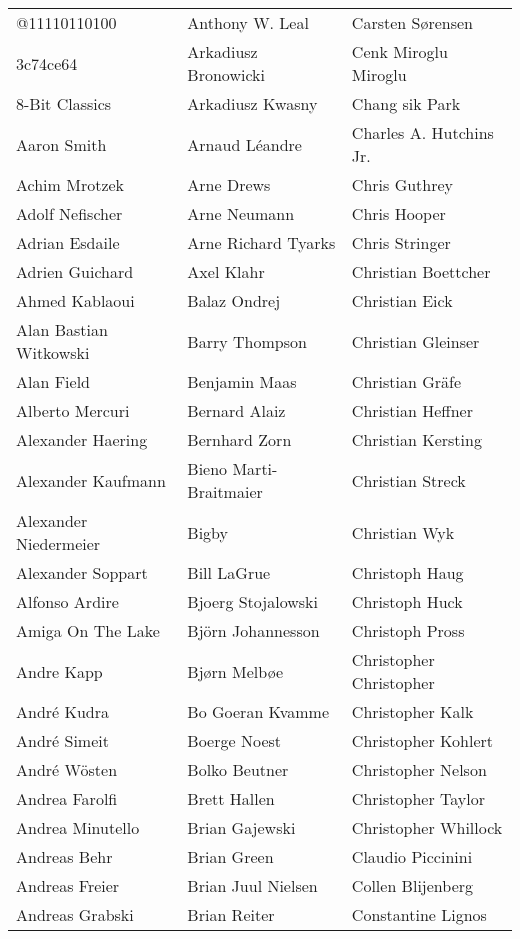 \newpage
\setlength{\tabcolsep}{1mm}
\begin{tabular}{p{4.5cm}p{4.5cm}p{4.5cm}}
@11110110100 & Anthony W. Leal & Carsten Sørensen \\
3c74ce64 & Arkadiusz Bronowicki & Cenk Miroglu Miroglu \\
8-Bit Classics & Arkadiusz Kwasny & Chang sik Park \\
Aaron Smith & Arnaud Léandre & Charles A. Hutchins Jr. \\
Achim Mrotzek & Arne Drews & Chris Guthrey \\
Adolf Nefischer & Arne Neumann & Chris Hooper \\
Adrian Esdaile & Arne Richard Tyarks & Chris Stringer \\
Adrien Guichard & Axel Klahr & Christian Boettcher \\
Ahmed Kablaoui & Balaz Ondrej & Christian Eick \\
Alan Bastian Witkowski & Barry Thompson & Christian Gleinser \\
Alan Field & Benjamin Maas & Christian Gräfe \\
Alberto Mercuri & Bernard Alaiz & Christian Heffner \\
Alexander Haering & Bernhard Zorn & Christian Kersting \\
Alexander Kaufmann & Bieno Marti-Braitmaier & Christian Streck \\
Alexander Niedermeier & Bigby & Christian Wyk \\
Alexander Soppart & Bill LaGrue & Christoph Haug \\
Alfonso Ardire & Bjoerg Stojalowski & Christoph Huck \\
Amiga On The Lake & Björn Johannesson & Christoph Pross \\
Andre Kapp & Bjørn Melbøe & Christopher Christopher \\
André Kudra & Bo Goeran Kvamme & Christopher Kalk \\
André Simeit & Boerge Noest & Christopher Kohlert \\
André Wösten & Bolko Beutner & Christopher Nelson \\
Andrea Farolfi & Brett Hallen & Christopher Taylor \\
Andrea Minutello & Brian Gajewski & Christopher Whillock \\
Andreas Behr & Brian Green & Claudio Piccinini \\
Andreas Freier & Brian Juul Nielsen & Collen Blijenberg \\
Andreas Grabski & Brian Reiter & Constantine Lignos \\

\end{tabular}
